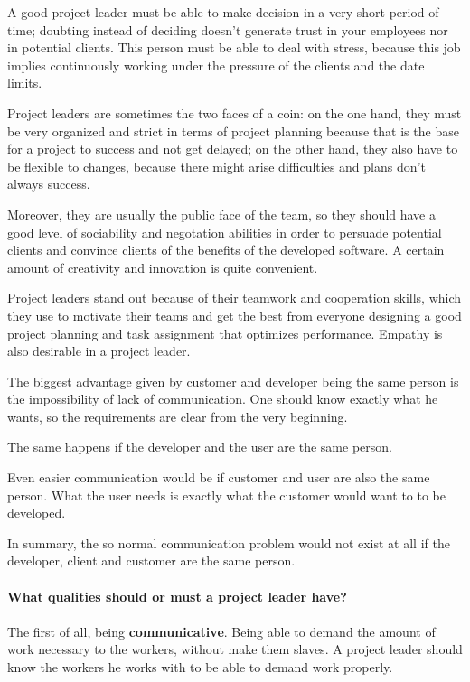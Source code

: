 \documentclass{article}
\begin{document}
A good project leader must be able to make decision in a very short period of time; doubting instead of deciding doesn't generate trust in your employees nor in potential clients. This person must be able to deal with stress, because this job implies continuously working under the pressure of the clients and the date limits. 

Project leaders are sometimes the two faces of a coin: on the one hand, they must be very organized and strict in terms of project planning because that is the base for a project to success and not get delayed; on the other hand, they also have to be flexible to changes, because there might arise difficulties and plans don't always success.

Moreover, they are usually the public face of the team, so they should have a good level of sociability and negotation abilities in order to persuade potential clients and convince clients of the benefits of the developed software. A certain amount of creativity and innovation is quite convenient.

Project leaders stand out because of their teamwork and cooperation skills, which they use to motivate their teams and get the best from everyone designing a good project planning and task assignment that optimizes performance. Empathy is also desirable in a project leader.

The biggest advantage given by  customer and developer being the same person is the impossibility of lack of communication. One should know exactly what he wants, so the requirements are clear from the very beginning.

The same happens if the developer and the user are the same person. 

Even easier communication would be if customer and user are also the same person. What the user needs is exactly what the customer would want to to be developed.

In summary, the so normal communication problem would not exist at all if the developer, client and customer are the same person.

\paragraph{What qualities should or must a project leader have?}
\paragraph{}
The first of all, being \textbf{communicative}. Being able to demand the amount of work necessary to the workers, without make them slaves. A project leader should know the workers he works with to be able to demand work properly.
\end{document}
